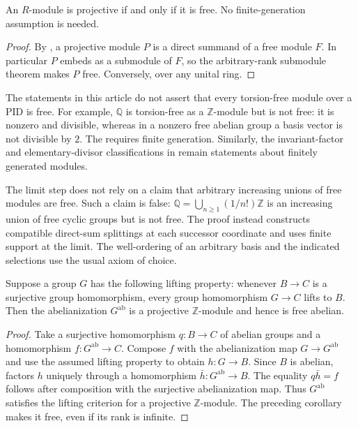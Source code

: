 \begin{corollary}\label{cor-projective-pid-free}
An $R$-module is projective if and only if it is free. No finite-generation assumption is needed.
\end{corollary}
\begin{proof}\label{proof-projective-pid-free}
By , a projective module $P$ is a direct summand of a free module $F$. In particular $P$ embeds as a submodule of $F$, so the arbitrary-rank submodule theorem makes $P$ free. Conversely,  over any unital ring.
\end{proof}

\begin{remark}\label{remark-rank-hypotheses}
The statements in this article do not assert that every torsion-free module over a PID is free. For example, $\mathbb Q$ is torsion-free as a $\mathbb Z$-module but is not free: it is nonzero and divisible, whereas in a nonzero free abelian group a basis vector is not divisible by $2$. The  requires finite generation. Similarly, the invariant-factor and elementary-divisor classifications in  remain statements about finitely generated modules.
\end{remark}

\begin{remark}\label{remark-compatible-filtration}
The limit step does not rely on a claim that arbitrary increasing unions of free modules are free. Such a claim is false: $\mathbb Q=\bigcup_{n\ge1}(1/n!)\mathbb Z$ is an increasing union of free cyclic groups but is not free. The proof instead constructs compatible direct-sum splittings at each successor coordinate and uses finite support at the limit. The well-ordering of an arbitrary basis and the indicated selections use the usual axiom of choice.
\end{remark}

\begin{proposition}\label{prop-abelianization-preserves-projectivity}
Suppose a group $G$ has the following lifting property: whenever $B\to C$ is a surjective group homomorphism, every group homomorphism $G\to C$ lifts to $B$. Then the abelianization $G^{\mathrm{ab}}$ is a projective $\mathbb Z$-module and hence is free abelian.
\end{proposition}
\begin{proof}\label{proof-abelianization-preserves-projectivity}
Take a surjective homomorphism $q:B\to C$ of abelian groups and a homomorphism $f:G^{\mathrm{ab}}\to C$. Compose $f$ with the abelianization map $G\to G^{\mathrm{ab}}$ and use the assumed lifting property to obtain $h:G\to B$. Since $B$ is abelian,  factors $h$ uniquely through a homomorphism $\bar h:G^{\mathrm{ab}}\to B$. The equality $q\bar h=f$ follows after composition with the surjective abelianization map. Thus $G^{\mathrm{ab}}$ satisfies the lifting criterion for a projective $\mathbb Z$-module. The preceding corollary makes it free, even if its rank is infinite.
\end{proof}
